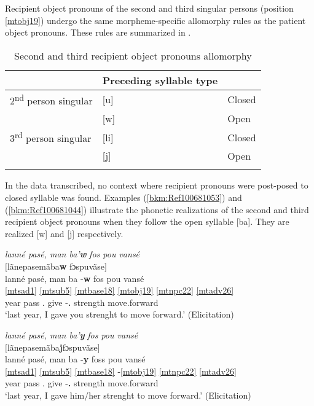 \documentclass[output=paper]{langscibook}
\begin{document}
Recipient object pronouns of the second and third singular persons (position \ref{mtobj19}) undergo the same morpheme-specific allomorphy rules as the patient object pronouns. These rules are summarized in .

\begin{table}
    \centering
    \caption{Second and third recipient object pronouns allomorphy}
    \label{tab:mart:key:3}
    \begin{tabular}{lll}
     \lsptoprule
    \multicolumn{2}{c}{{\bfseries Recipient object pronoun realizations}} & {\bfseries Preceding syllable type}\\ \midrule
    2\textsuperscript{nd} person singular & [u] & Closed\\
    & [w] & Open\\
    3\textsuperscript{rd} person singular & [li] & Closed\\
    & [j] & Open\\
\lspbottomrule
    \end{tabular}  
\end{table}

In the data transcribed, no context where recipient pronouns were post-posed to closed syllable was found. Examples (\ref{bkm:Ref100681053}) and (\ref{bkm:Ref100681044}) illustrate the phonetic realizations of the second and third recipient object pronouns when they follow the open syllable [ba]. They are realized [w] and [j] respectively.


\ea\label{bkm:Ref100681053}
\textit{lanné pasé, man ba’}\textbf{\textit{w}} \textit{fos pou vansé}\\
$[$lãnepasemãba\textbf{w} fɔspuvãse$]$\\
\glll lanné pasé, man ba -\textbf{w} fos pou vansé\\
\ref{mtsad1} {} \ref{mtsub5} \ref{mtbase18} \ref{mtobj19} \ref{mtnpc22} \ref{mtadv26} \\ 
year pass \First\Sg.\Sarg{} give -\textbf{\Second\Sg.\Obj{}} strength \Prep{} move.forward\\
\glt `last year, I gave you strenght to move forward.' (Elicitation)
\z
 
\ea\label{bkm:Ref100681044}
\textit{lanné pasé, man ba’}\textbf{\textit{y}} \textit{fos pou vansé}\\
$[$lãnepasemãba\textbf{j}fɔspuvãse$]$\\
\glll lanné pasé, man ba -\textbf{y} foss pou vansé\\
\ref{mtsad1} {} \ref{mtsub5} \ref{mtbase18} -\ref{mtobj19} \ref{mtnpc22} \ref{mtadv26} \\
year pass \First\Sg.\Sarg{} give -\textbf{\Third\Sg.\Obj{}} strength \Prep{} move.forward\\
\glt `last year, I gave him/her strenght to move forward.' (Elicitation)
\z
\end{document}

